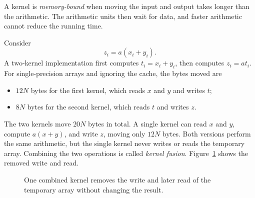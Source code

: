 \documentclass[11pt]{article}
\numberwithin{equation}{section}
\numberwithin{figure}{section}
\numberwithin{table}{section}
\begin{document}
A kernel is \emph{memory-bound} when moving the input and output takes longer than
the arithmetic.  The arithmetic units then wait for data, and faster arithmetic
cannot reduce the running time.

Consider
\begin{equation}
  z_i=a(x_i+y_i).
  \label{eq:bandwidth-fusion-example}
\end{equation}
A two-kernel implementation first computes $t_i=x_i+y_i$, then computes
$z_i=a t_i$.  For single-precision arrays and ignoring the cache, the bytes moved are
\begin{itemize}
  \item $12N$ bytes for the first kernel, which reads $x$ and $y$ and writes $t$;
  \item $8N$ bytes for the second kernel, which reads $t$ and writes $z$.
\end{itemize}
The two kernels move $20N$ bytes in total.  A single kernel can read $x$ and $y$,
compute $a(x+y)$, and write $z$, moving only $12N$ bytes.  Both versions perform the
same arithmetic, but the single kernel never writes or reads the temporary array.
Combining the two operations is called \emph{kernel fusion}.
Figure~\ref{fig:bandwidth-fusion} shows the removed write and read.

\begin{figure}[htbp]
  \centering
  \caption{One combined kernel removes the write and later read of the temporary
  array without changing the result.}
  \label{fig:bandwidth-fusion}
\end{figure}
\FloatBarrier
\end{document}
